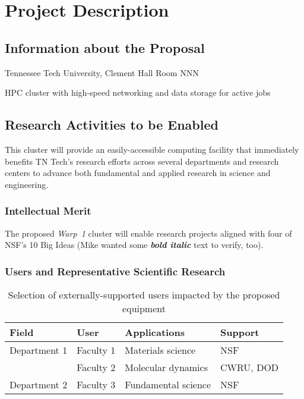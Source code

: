 \chapter{Project Description}

\section{Information about the Proposal}

\begin{description}[labelwidth={\widthof{\textbf{Instrument Location: }}},leftmargin=\labelwidth,labelsep=0pt]
\item[Instrument Location:] Tennessee Tech University, Clement Hall Room NNN
\item[Instrument Type:] HPC cluster with high-speed networking and data storage for active jobs
\end{description}

\section{Research Activities to be Enabled}

This cluster will provide an easily-accessible computing facility that immediately benefits TN Tech's research efforts across several departments and research centers to advance both fundamental and applied research in science and engineering.

\subsection{Intellectual Merit}

The proposed \textit{Warp~1} cluster will enable research projects aligned with four of NSF's 10 Big Ideas
(Mike wanted some \textbf{\textit{bold italic}} text to verify, too).

\subsection{Users and Representative Scientific Research}

\begin{table}
\centering
\caption{\label{tab:users} Selection of externally-supported users impacted by the proposed equipment}
\begin{tabular}{P{1.7in}P{1.5in}P{1.6in}P{1.25in}} \toprule
{\bfseries Field} & {\bfseries User} & {\bfseries Applications} & {\bfseries Support} \\ \midrule
Department 1 & Faculty 1 & Materials science & NSF \\
             & Faculty 2 & Molecular dynamics & CWRU, DOD \\ \addlinespace

Department 2 & Faculty 3 & Fundamental science & NSF \\ \bottomrule
\end{tabular}
\end{table}


